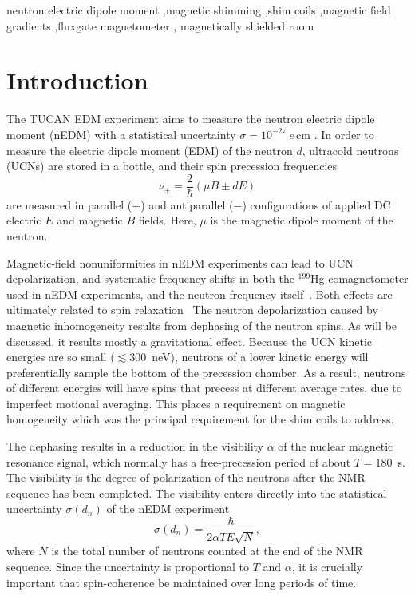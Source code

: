 \documentclass[preprint,12pt]{elsarticle}
\begin{document}
\begin{frontmatter}
\begin{keyword}
neutron electric dipole moment \sep magnetic shimming \sep shim coils
\sep magnetic field gradients \sep fluxgate magnetometer \sep
magnetically shielded room
\end{keyword}

\end{frontmatter}

\section{Introduction}\label{sec1}

The TUCAN EDM experiment aims to measure the neutron electric dipole
moment (nEDM) with a statistical uncertainty
$\sigma=10^{-27}~e\,\mathrm{cm}$ \cite{bib:npn}. In order to measure
the electric dipole moment (EDM) of the neutron $d$, ultracold
neutrons (UCNs) are stored in a bottle, and their spin precession
frequencies
\begin{equation}
\nu_\pm=\frac{2}{\hbar}(\mu B\pm dE)
\end{equation}
are measured in parallel ($+$) and antiparallel ($-$) configurations
of applied DC electric $E$ and magnetic $B$ fields.  Here, $\mu$ is
the magnetic dipole moment of the neutron.

Magnetic-field nonuniformities in nEDM experiments can lead to UCN
depolarization, and systematic frequency shifts in both the $^{199}$Hg
comagnetometer used in nEDM experiments, and the neutron frequency
itself~\cite{pendlebury2015,bib:Abel2019,bib:Abel2020CsMag,bib:Abel2022Mapping}.
Both effects are ultimately related to spin
relaxation~\cite{bib:PignolRoccia2012,bib:Pignol2015SpinRelaxation,pendlebury2015}
The neutron depolarization caused by magnetic inhomogeneity results
from dephasing of the neutron spins.  As will be discussed, it results
mostly a gravitational effect.  Because the UCN kinetic energies are
so small ($\lesssim 300$~neV), neutrons of a lower kinetic energy will
preferentially sample the bottom of the precession chamber.  As a
result, neutrons of different energies will have spins that precess at
different average rates, due to imperfect motional averaging.  This
places a requirement on magnetic homogeneity which was the principal
requirement for the shim coils to address.

The dephasing results in a reduction in the visibility $\alpha$ of the
nuclear magnetic resonance signal, which normally has a
free-precession period of about $T=180$~s.  The visibility is the
degree of polarization of the neutrons after the NMR sequence has been
completed.  The visibility enters directly into the statistical
uncertainty $\sigma(d_n)$ of the nEDM experiment
\begin{equation}
\sigma(d_n)=\frac{\hbar}{2\alpha TE\sqrt{N}},
\end{equation}
where $N$ is the total number of neutrons counted at the end of the
NMR sequence.  Since the uncertainty is proportional to $T$ and
$\alpha$, it is crucially important that spin-coherence be maintained
over long periods of time.
\end{document}
